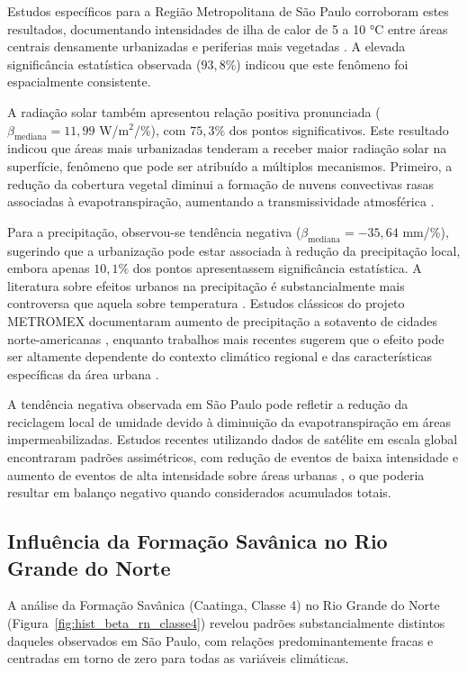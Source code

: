 Estudos específicos para a Região Metropolitana de São Paulo corroboram estes resultados, documentando intensidades de ilha de calor de 5 a 10 °C entre áreas centrais densamente urbanizadas e periferias mais vegetadas \citep{ferreira2019urban, santos2017assessment}. A elevada significância estatística observada ($93{,}8\%$) indicou que este fenômeno foi espacialmente consistente.

A radiação solar também apresentou relação positiva pronunciada ($\beta_{\text{mediana}} = 11{,}99$ W/m$^2$/\%), com $75{,}3\%$ dos pontos significativos. Este resultado indicou que áreas mais urbanizadas tenderam a receber maior radiação solar na superfície, fenômeno que pode ser atribuído a múltiplos mecanismos. Primeiro, a redução da cobertura vegetal diminui a formação de nuvens convectivas rasas associadas à evapotranspiração, aumentando a transmissividade atmosférica \citep{teuling2017contrasting}.

Para a precipitação, observou-se tendência negativa ($\beta_{\text{mediana}} = -35{,}64$ mm/\%), sugerindo que a urbanização pode estar associada à redução da precipitação local, embora apenas $10{,}1\%$ dos pontos apresentassem significância estatística. A literatura sobre efeitos urbanos na precipitação é substancialmente mais controversa que aquela sobre temperatura \citep{shepherd2005review, niyogi2017urbanization}. Estudos clássicos do projeto METROMEX documentaram aumento de precipitação a sotavento de cidades norte-americanas \citep{changnon1981metromex}, enquanto trabalhos mais recentes sugerem que o efeito pode ser altamente dependente do contexto climático regional e das características específicas da área urbana \citep{han2014effects, liu2017precipitation}.

A tendência negativa observada em São Paulo pode refletir a redução da reciclagem local de umidade devido à diminuição da evapotranspiração em áreas impermeabilizadas. Estudos recentes utilizando dados de satélite em escala global encontraram padrões assimétricos, com redução de eventos de baixa intensidade e aumento de eventos de alta intensidade sobre áreas urbanas \citep{li2020asymmetric}, o que poderia resultar em balanço negativo quando considerados acumulados totais.

\subsection{Influência da Formação Savânica no Rio Grande do Norte}

A análise da Formação Savânica (Caatinga, Classe 4) no Rio Grande do Norte (Figura~\ref{fig:hist_beta_rn_classe4}) revelou padrões substancialmente distintos daqueles observados em São Paulo, com relações predominantemente fracas e centradas em torno de zero para todas as variáveis climáticas.

